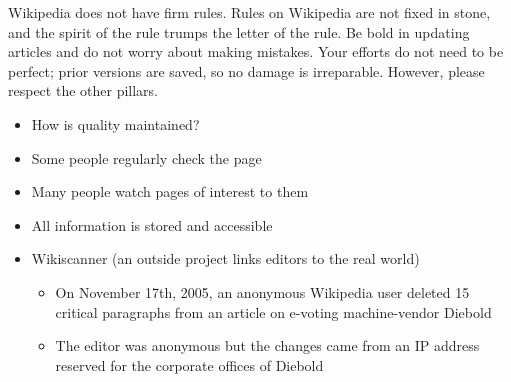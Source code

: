 \documentclass[a4paper,landscape,headrule,footrule,xetex]{foils}
\begin{document}

\begin{large}
  Wikipedia does not have firm rules. Rules on Wikipedia are not fixed
  in stone, and the spirit of the rule trumps the letter of the
  rule. Be bold in updating articles and do not worry about making
  mistakes. Your efforts do not need to be perfect; prior versions are
  saved, so no damage is irreparable. However, please respect the
  other pillars.
\end{large}


\MyLogo{}
\begin{itemize}
\item How is quality maintained?
\item Some people regularly check the  page
\item Many people watch pages of interest to them
\item All information is stored and accessible
\item Wikiscanner (an outside project links editors to the real world)
  \begin{itemize}
  \item On November 17th, 2005, an anonymous Wikipedia user deleted 15 critical 
    paragraphs from an article on e-voting machine-vendor Diebold
  \item The editor was anonymous but the changes came from an IP
    address reserved for the corporate offices of Diebold
  \end{itemize}
\end{itemize}




\end{document}
